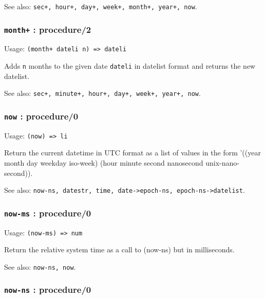 \documentclass[
]{article}
\newcommand{\passthrough}[1]{#1}
\begin{document}
See also:
\passthrough{\lstinline!sec+, hour+, day+, week+, month+, year+, now!}.

\hypertarget{month-procedure2}{%
\subsubsection{\texorpdfstring{\texttt{month+} :
procedure/2}{month+ : procedure/2}}\label{month-procedure2}}

Usage: \passthrough{\lstinline!(month+ dateli n) => dateli!}

Adds \passthrough{\lstinline!n!} months to the given date
\passthrough{\lstinline!dateli!} in datelist format and returns the new
datelist.

See also:
\passthrough{\lstinline!sec+, minute+, hour+, day+, week+, year+, now!}.

\hypertarget{now-procedure0}{%
\subsubsection{\texorpdfstring{\texttt{now} :
procedure/0}{now : procedure/0}}\label{now-procedure0}}

Usage: \passthrough{\lstinline!(now) => li!}

Return the current datetime in UTC format as a list of values in the
form '((year month day weekday iso-week) (hour minute second nanosecond
unix-nano-second)).

See also:
\passthrough{\lstinline!now-ns, datestr, time, date->epoch-ns, epoch-ns->datelist!}.

\hypertarget{now-ms-procedure0}{%
\subsubsection{\texorpdfstring{\texttt{now-ms} :
procedure/0}{now-ms : procedure/0}}\label{now-ms-procedure0}}

Usage: \passthrough{\lstinline!(now-ms) => num!}

Return the relative system time as a call to (now-ns) but in
milliseconds.

See also: \passthrough{\lstinline!now-ns, now!}.

\hypertarget{now-ns-procedure0}{%
\subsubsection{\texorpdfstring{\texttt{now-ns} :
procedure/0}{now-ns : procedure/0}}\label{now-ns-procedure0}}
\end{document}
